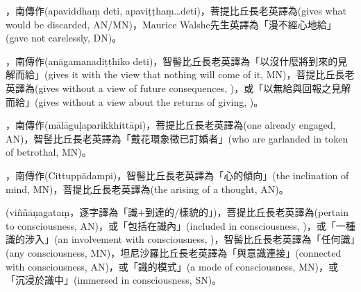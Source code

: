 \startitemgroup[noteitems]
\item{}，南傳作(apaviddhaṃ deti, apaviṭṭhaṃ…deti)，菩提比丘長老英譯為(gives what would be discarded, AN/MN)，Maurice Walshe先生英譯為「漫不經心地給」(gave not carelessly, DN)。
\stopitemgroup

\startitemgroup[noteitems]
\item{}，南傳作(anāgamanadiṭṭhiko deti)，智髻比丘長老英譯為「以沒什麼將到來的見解而給」(gives it with the view that nothing will come of it, MN)，菩提比丘長老英譯為(gives without a view of future consequences, )，或「以無給與回報之見解而給」(gives without a view about the returns of giving, )。
\stopitemgroup

\startitemgroup[noteitems]
\item{}，南傳作(mālāguḷaparikkhittāpi)，菩提比丘長老英譯為(one already engaged, AN)，智髻比丘長老英譯為「戴花環象徵已訂婚者」(who are garlanded in token of betrothal, MN)。
\stopitemgroup

\startitemgroup[noteitems]
\item{}，南傳作(Cittuppādampi)，智髻比丘長老英譯為「心的傾向」(the inclination of mind, MN)，菩提比丘長老英譯為(the arising of a thought, AN)。
\stopitemgroup

\startitemgroup[noteitems]
\item{}(viññāṇagataṃ，逐字譯為「識+到達的/樣貌的」)，菩提比丘長老英譯為(pertain to consciousness, AN)，或「包括在識內」(included in consciousness, )，或「一種識的涉入」(an involvement with consciousness, )，智髻比丘長老英譯為「任何識」(any consciousness, MN)，坦尼沙羅比丘長老英譯為「與意識連接」(connected with consciousness, AN)，或「識的模式」(a mode of consciousness, MN)，或「沉浸於識中」(immersed in consciousness, SN)。
\stopitemgroup

